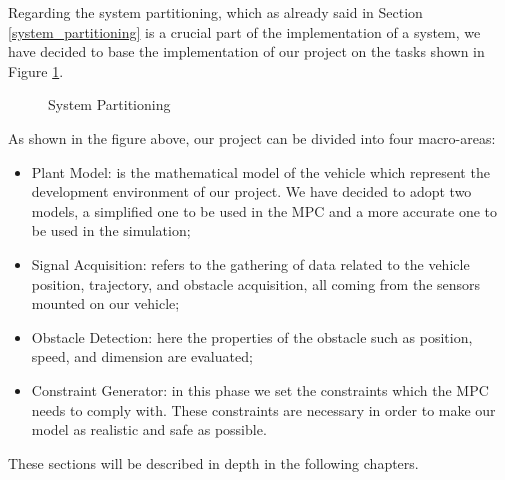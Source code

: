 Regarding the system partitioning, which as already said in Section \ref{system_partitioning} is a crucial part of the implementation of a system, we have decided to base the implementation of our project on the tasks shown in Figure \ref{fig:partitioning}.

\begin{figure}[H]
    \centering
    \caption{System Partitioning}
    \label{fig:partitioning}
\end{figure}

As shown in the figure above, our project can be divided into four macro-areas:
\begin{itemize}
    \item Plant Model: is the mathematical model of the vehicle which represent the development environment of our project. We have decided to adopt two models, a simplified one to be used in the MPC and a more accurate one to be used in the simulation; 
    \item Signal Acquisition: refers to the gathering of data related to the vehicle position, trajectory, and obstacle acquisition, all coming from the sensors mounted on our vehicle;
    \item Obstacle Detection: here the properties of the obstacle such as position, speed, and dimension  are evaluated;
    \item Constraint Generator: in this phase we set the constraints which the MPC needs to comply with. These constraints are necessary in order to make our model as realistic and safe as possible.
\end{itemize}

These sections will be described in depth in the following chapters.




